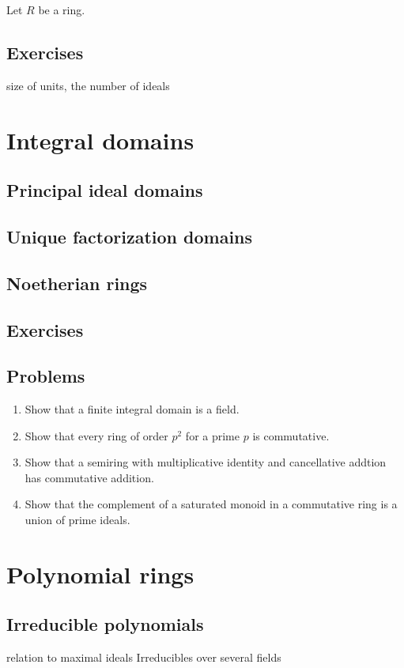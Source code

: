 \documentclass{../note}
\begin{document}
\begin{prb}
Let $R$ be a ring.
\end{prb}


\section*{Exercises}
size of units, the number of ideals




\chapter{Integral domains}
\section{Principal ideal domains}
\section{Unique factorization domains}
\section{Noetherian rings}

\section*{Exercises}
\section*{Problems}
\begin{enumerate}
\item Show that a finite integral domain is a field.
\item Show that every ring of order $p^2$ for a prime $p$ is commutative.
\item Show that a semiring with multiplicative identity and cancellative addtion has commutative addition.
\item Show that the complement of a saturated monoid in a commutative ring is a union of prime ideals.
\end{enumerate}


\chapter{Polynomial rings}
\section{Irreducible polynomials}
relation to maximal ideals
Irreducibles over several fields
\begin{prb}
\end{prb}
\begin{prb}
\end{prb}
\end{document}
